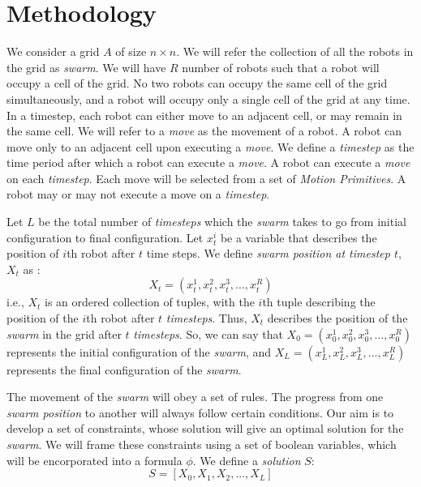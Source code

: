 \documentclass{article}[11pt]
\begin{document}
	\section{Methodology}
		We consider a grid $A$ of size $n \times n$.
		We will refer the collection of all the robots in the grid as \textit{swarm}. 
		We will have $R$ number of robots such that a robot will occupy a cell of the grid.
		No two robots can occupy the same cell of the grid simultaneously, and a robot will occupy only a single cell of the grid at any time.
		In a timestep, each robot can either move to an adjacent cell, or may remain in the same cell.
		We will refer to a \textit{move} as the movement of a robot.
		A robot can move only to an adjacent cell upon executing a \textit{move}.
		We define a \textit{timestep} as the time period after which a robot can execute a \textit{move}.
		A robot can execute a \textit{move} on each \textit{timestep}.
		Each move will be selected from a set of \textit{Motion Primitives}. 
		A robot may or may not execute a move on a \textit{timestep}.

		Let $L$ be the total number of \textit{timesteps} which the \textit{swarm} takes to go from initial configuration to final configuration.  
		Let $x_t^i$ be a variable that describes the position of $i$th robot after $t$ time steps.
		We define \textit{swarm position at timestep $t$}, $X_t$ as :
		$$
			X_t = (x_t^1, x_t^2, x_t^3, . . . , x_t^R)
		$$
		i.e., $X_t$ is an ordered collection of tuples, with the $i$th tuple describing the position of the $i$th robot after $t$ \textit{timesteps}.
		Thus, $X_t$ describes the position of the \textit{swarm} in the grid after $t$ \textit{timesteps}. So, we can say that $X_0 =(x_0^1, x_0^2, x_0^3, . . . , x_0^R)$ represents the initial configuration of the \textit{swarm}, and $X_L = (x_L^1, x_L^2, x_L^3, . . . , x_L^R)$ represents the final configuration of the \textit{swarm}.

		The movement of the \textit{swarm} will obey a set of rules. The progress from one \textit{swarm position} to another will always follow certain conditions.
		Our aim is to develop a set of constraints, whose solution will give an optimal solution for the \textit{swarm}.
		We will frame these constraints using a set of boolean variables, which will be encorporated into a formula $\phi$.
		We define a \textit{solution} $S$:
		$$
			S = [X_0, X_1, X_2, . . . , X_L]  
		$$
\end{document}
